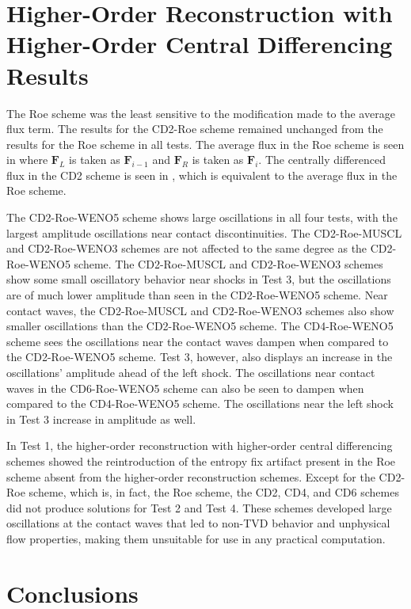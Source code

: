 \section{Higher-Order Reconstruction with Higher-Order Central Differencing Results}

The Roe scheme was the least sensitive to the modification made to the average flux term. The results for the CD2-Roe scheme remained unchanged from the results for the Roe scheme in all tests. The average flux in the Roe scheme is seen in  where $\boldsymbol{F}_L$ is taken as $\boldsymbol{F}_{i-1}$ and $\boldsymbol{F}_R$ is taken as $\boldsymbol{F}_i$. The centrally differenced flux in the CD2 scheme is seen in , which is equivalent to the average flux in the Roe scheme. 

The CD2-Roe-WENO5 scheme shows large oscillations in all four tests, with the largest amplitude oscillations near contact discontinuities. The CD2-Roe-MUSCL and CD2-Roe-WENO3 schemes are not affected to the same degree as the CD2-Roe-WENO5 scheme. The CD2-Roe-MUSCL and CD2-Roe-WENO3 schemes show some small oscillatory behavior near shocks in Test 3, but the oscillations are of much lower amplitude than seen in the CD2-Roe-WENO5 scheme. Near contact waves, the CD2-Roe-MUSCL and CD2-Roe-WENO3 schemes also show smaller oscillations than the CD2-Roe-WENO5 scheme. The CD4-Roe-WENO5 scheme sees the oscillations near the contact waves dampen when compared to the CD2-Roe-WENO5 scheme. Test 3, however, also displays an increase in the oscillations' amplitude ahead of the left shock. The oscillations near contact waves in the CD6-Roe-WENO5 scheme can also be seen to dampen when compared to the CD4-Roe-WENO5 scheme. The oscillations near the left shock in Test 3 increase in amplitude as well.

In Test 1, the higher-order reconstruction with higher-order central differencing schemes showed the reintroduction of the entropy fix artifact present in the Roe scheme absent from the higher-order reconstruction schemes. Except for the CD2-Roe scheme, which is, in fact, the Roe scheme, the CD2, CD4, and CD6 schemes did not produce solutions for Test 2 and Test 4. These schemes developed large oscillations at the contact waves that led to non-TVD behavior and unphysical flow properties, making them unsuitable for use in any practical computation.
\section{Conclusions}

